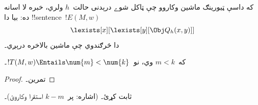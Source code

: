 \documentclass[../../../include/open-logic-section]{subfiles}
\begin{document}
که داسې ټيورينګ ماشين وکاروو چې ټاکل شوے درېدنی حالت~$h$ ولري، خبره
لا اسانه ده: بيا دا !!{sentence}~$!E(M, w)$
\[
\lexists[x][\lexists[y][\Obj Q_h(x, y)]]
\]
دا څرګندوي چې ماشين بالاخره درېږي۔

\begin{prop}
که~$m < k$ وي، نو~$!T(M, w) \Entails \num{m} < \num{k}$۔
\end{prop}

\begin{proof}
تمرین۔
\end{proof}

\begin{prob}
 ثابت کړئ۔
(اشاره: پر~$k-m$ استقرا وکاروئ)۔
\end{prob}
\end{document}
